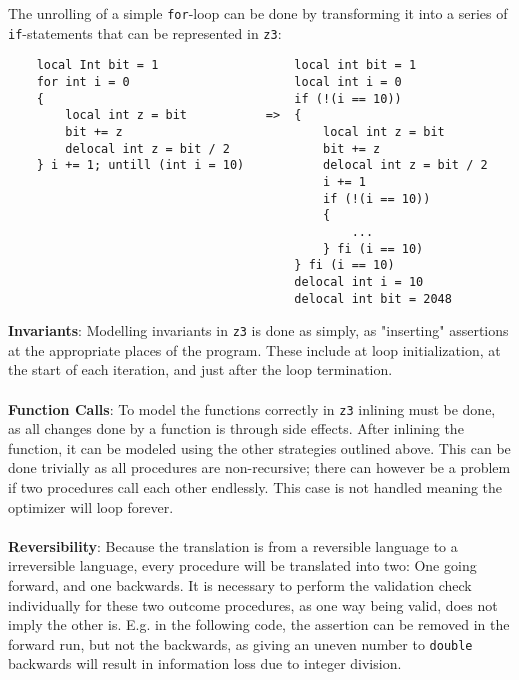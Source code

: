 The unrolling of a simple \texttt{for}-loop can be done by transforming it into a series of
\texttt{if}-statements that can be represented in \texttt{z3}:
\begin{verbatim}
    local Int bit = 1                   local int bit = 1
    for int i = 0                       local int i = 0
    {                                   if (!(i == 10))
        local int z = bit           =>  {
        bit += z                            local int z = bit   
        delocal int z = bit / 2             bit += z
    } i += 1; untill (int i = 10)           delocal int z = bit / 2
                                            i += 1
                                            if (!(i == 10))
                                            {
                                                ...
                                            } fi (i == 10)
                                        } fi (i == 10)
                                        delocal int i = 10
                                        delocal int bit = 2048
\end{verbatim}
\noindent
\textbf{Invariants}:
Modelling invariants in \texttt{z3} is done as simply, as "inserting" assertions at the appropriate
places of the program. These include at loop initialization, at the start of each iteration, and
just after the loop termination.
\\
\\
\textbf{Function Calls}:
To model the functions correctly in \texttt{z3} inlining must be done, as all changes done
by a function is through side effects. After inlining the function, it can be modeled using the
other strategies outlined above. This can be done trivially as all procedures are non-recursive;
there can however be a problem if two procedures call each other endlessly. This case is not handled
meaning the optimizer will loop forever.
\\
\\
\textbf{Reversibility}:
Because the translation is from a reversible language to a irreversible language, every procedure
will be translated into two: One going forward, and one backwards. It is necessary to perform
the validation check individually for these two outcome procedures, as one way being valid, does
not imply the other is. E.g. in the following code, the assertion can be removed in the
forward run, but not the backwards, as giving an uneven number to \texttt{double} backwards will
result in information loss due to integer division.

